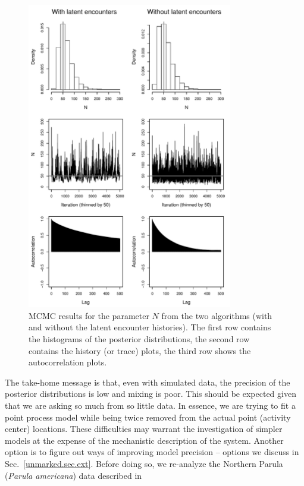 \begin{figure}
  \centering
  \includegraphics[width=0.8\textwidth]{Ch18-Unmarked/figs/mc1mc2}
  \caption{MCMC results for the parameter $N$ from the two algorithms
    (with and without the latent encounter histories). The first
    row contains the histograms of the posterior distributions, the second row
    contains the history (or trace) plots, the third row shows the
    autocorrelation plots.}
  \label{unmarked.fig.Nsim}
\end{figure}

The take-home message is that, even with simulated data,
the precision of the posterior distributions is
low and mixing is poor. This should be expected given that we are
asking so much from so little data. In essence, we are trying to fit a
point process model while being twice removed from the actual point
(activity center) locations. These difficulties may warrant the investigation of simpler
models at the expense of the mechanistic description of the system. Another option is to
figure out ways of improving model precision -- options we discuss in
Sec.~\ref{unmarked.sec.ext}. Before doing so, we re-analyze the
Northern Parula ({\it Parula americana}) data
described in \citet{chandler_royle:2012}



